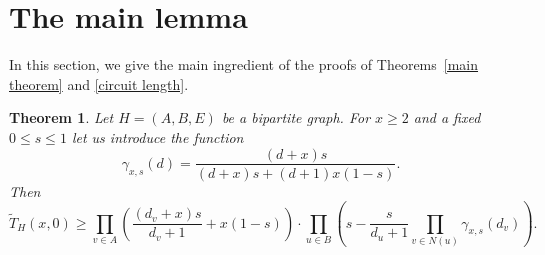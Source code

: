 \documentclass[12pt,a4paper]{amsart}
\numberwithin{equation}{section}
\theoremstyle{plain}
\newtheorem{Th}{Theorem}[section]
\theoremstyle{definition}
\newcommand{\1}{\textbf{1}}
\begin{document}
\section{The main lemma}
\label{sect: main_lemma}

In this section, we give the main ingredient of the proofs of Theorems~\ref{main theorem} and \ref{circuit length}.

\begin{Th} \label{main_lemma}
Let $H=(A,B,E)$ be a bipartite graph. For $x\geqslant2$ and a fixed $0\leqslant   s\leqslant   1$ let us introduce the function
$$\gamma_{x,s}(d)=\frac{(d+x)s}{(d+x)s+(d+1)x(1-s)}.$$
Then
$$\widetilde{T}_H(x,0)\geqslant \prod_{v\in A}\left(\frac{(d_v+x)s}{d_v+1}+x(1-s)\right)\cdot \prod_{u\in B}\left(s-\frac{s}{d_u+1}\prod_{v\in N(u)}\gamma_{x,s}(d_v)\right).$$
\end{Th}
\end{document}
